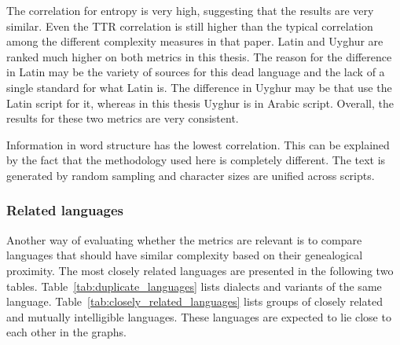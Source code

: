 The correlation for entropy is very high, suggesting that the results are very similar. Even the TTR correlation is still higher than the typical correlation among the different complexity measures in that paper. Latin and Uyghur are ranked much higher on both metrics in this thesis. The reason for the difference in Latin may be the variety of sources for this dead language and the lack of a single standard for what Latin is. The difference in Uyghur may be that \textcite{Coltekin2022} use the Latin script for it, whereas in this thesis Uyghur is in Arabic script. Overall, the results for these two metrics are very consistent.

Information in word structure has the lowest correlation. This can be explained by the fact that the methodology used here is completely different. The text is generated by random sampling and character sizes are unified across scripts.

\subsubsection{Related languages}
Another way of evaluating whether the metrics are relevant is to compare languages that should have similar complexity based on their genealogical proximity. The most closely related languages are presented in the following two tables. Table~\ref{tab:duplicate_languages} lists dialects and variants of the same language. Table~\ref{tab:closely_related_languages} lists groups of closely related and mutually intelligible languages. These languages are expected to lie close to each other in the graphs.
    
